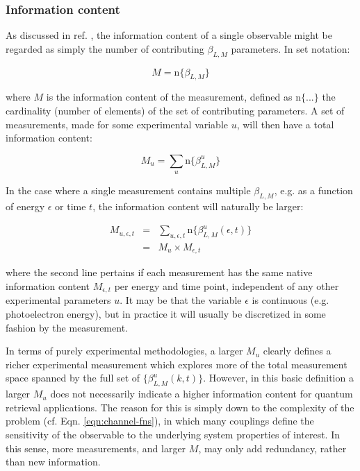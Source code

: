\documentclass[10pt]{article}
\begin{document}
\subsubsection{Information content\label{sec:info-content}}

As discussed in ref. \cite{hockett2018QMP2}, the information content of a single observable might be regarded as simply the number of contributing $\beta_{L,M}$ parameters. In set notation:

\begin{equation}
M=\mathrm{n}\{\beta_{L,M}\}
\end{equation}

where $M$ is the information content of the measurement, defined
as $\mathrm{n}\{...\}$ the cardinality (number of elements) of the
set of contributing parameters. A set of measurements, made for some
experimental variable $u$, will then have a total information content:

\begin{equation}
M_{u}=\sum_{u}\mathrm{n}\{\beta_{L,M}^{u}\}
\end{equation}

In the case where a single measurement contains multiple $\beta_{L,M}$, e.g. as a function of energy $\epsilon$ or time $t$, the information content will naturally be larger:

\begin{eqnarray}
M_{u,\epsilon,t} & = & \sum_{u,\epsilon,t}\mathrm{n}\{\beta_{L,M}^{u}(\epsilon,t)\}\\
 & = & M_{u}\times M_{\epsilon,t}
\end{eqnarray}

where the second line pertains if each measurement has the same native
information content $M_{\epsilon,t}$ per energy and time point, independent of any other experimental parameters $u$. It may be that the variable
$\epsilon$ is continuous (e.g. photoelectron energy), but in practice it
will usually be discretized in some fashion by the measurement.

In terms of purely experimental methodologies, a larger $M_{u}$ clearly defines a richer experimental measurement which explores more of the total measurement space spanned by the full set of $\{\beta_{L,M}^{u}(k,t)\}$. However, in this basic definition a larger $M_{u}$ does not necessarily indicate a higher information content for quantum retrieval applications.
The reason for this is simply down to the complexity of the problem
(cf. Eqn. \ref{eqn:channel-fns}), in which many couplings define
the sensitivity of the observable to the underlying system properties
of interest. In this sense, more measurements, and larger $M$, may
only add redundancy, rather than new information.
\end{document}
